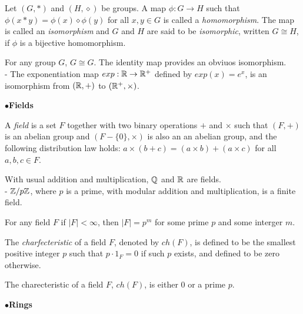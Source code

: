 \begin{definition}
  Let $(G,\ast)$ and $(H,\diamond)$ be groups. A map $\phi:G\rightarrow H$ such that
  $\phi(x\ast y)=\phi(x)\diamond\phi(y)$ for all $x,y\in G$ is called a \textit{homomorphism}.
  The map is called an \textit{isomorphism} and $G$ and $H$ are said to be \textit{isomorphic},
  written $G\cong H$, if $\phi$ is a bijective homomorphism. \cite{dummit}
\end{definition}

\begin{ex}
  For any group $G$, $G\cong G$. The identity map provides an obviuos isomorphism.\\
  - The exponentiation map $exp:\mathbb{R}\rightarrow \mathbb{R}^+$ defined by $exp(x)=e^x$, is an isomorphism
  from $(\mathbb{R},+)$ to $(\mathbb{R}^+,\times)$.
\end{ex}

$\bullet$\textbf{Fields}
\begin{definition}
  A \textit{field} is a set $F$ together with two binary operations $+$ and $\times$ such that
  $(F,+)$ is an abelian group and $(F-\{0\},\times)$ is also an an abelian group, and the
  following distribution law holds: $a\times(b+c)=(a\times b)+(a\times c)$ for all $a,b,c\in F$.
  \cite{dummit}
\end{definition}

\begin{ex}
  With usual addition and multiplication, $\mathbb{Q}$ and $\mathbb{R}$ are fields.\\
   - $\mathbb{Z}/p\mathbb{Z}$, where $p$ is a prime, with modular addition and multiplication, is a finite
  field.
\end{ex}

\begin{remark}
  For any field $F$ if $\vert F\vert <\infty$, then $\vert F\vert = p^m$ for some prime $p$
  and some interger $m$.
\end{remark}

\begin{definition}
  The \textit{charfecteristic} of a field $F$, denoted by $ch(F)$, is defined to be the smallest
  positive integer $p$ such that $p\cdot 1_F=0$ if such $p$ exists, and defined to be zero
  otherwise. \cite{dummit}
\end{definition}

\begin{remark}
  The charecteristic of a field $F$, $ch(F)$, is either $0$ or a prime $p$.
\end{remark}

$\bullet$\textbf{Rings}

